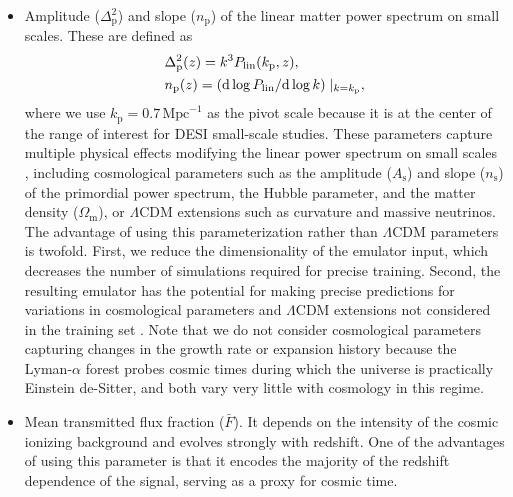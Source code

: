 \documentclass[fleqn,usenatbib]{mnras}
\newcommand{\lyaf}{Lyman-$\alpha$ forest\xspace}
\newcommand{\mflux}{\ensuremath{\bar{F}}\xspace}
\begin{document}
\begin{itemize}
    \item Amplitude ($\Delta^2_\mathrm{p}$) and slope ($n_\mathrm{p}$) of the linear matter power spectrum on small scales. These are defined as
    \begin{align}
        \label{eq:amplitude}
        & \Delta_\mathrm{p}^2(z) = k^3 P_{\rm lin} (k_\mathrm{p}, z),\\
        \label{eq:slope}
        & n_\mathrm{p}(z) = \left(\mathrm{d}\log P_{\rm lin} / \mathrm{d}\log k\right)\mid_{k = k_\mathrm{p}},
    \end{align}
    where we use $k_\mathrm{p} = 0.7\,\mathrm{Mpc}^{-1}$ as the pivot scale because it is at the center of the range of interest for DESI small-scale studies. These parameters capture multiple physical effects modifying the linear power spectrum on small scales \citep[see][for a detailed discussion]{Pedersen2021}, including cosmological parameters such as the amplitude ($A_\mathrm{s}$) and slope ($n_\mathrm{s}$) of the primordial power spectrum, the Hubble parameter, and the matter density ($\Omega_\mathrm{m}$), or $\Lambda$CDM extensions such as curvature and massive neutrinos. The advantage of using this parameterization rather than $\Lambda$CDM parameters is twofold. First, we reduce the dimensionality of the emulator input, which decreases the number of simulations required for precise training. Second, the resulting emulator has the potential for making precise predictions for variations in cosmological parameters and $\Lambda$CDM extensions not considered in the training set \citep[][]{Pedersen2021, pedersen2023CompressingCosmologicalInformation, cabayol-garcia2023NeuralNetworkEmulator}. Note that we do not consider cosmological parameters capturing changes in the growth rate or expansion history because the \lyaf probes cosmic times during which the universe is practically Einstein de-Sitter, and both vary very little with cosmology in this regime.

    \item Mean transmitted flux fraction (\mflux). It depends on the intensity of the cosmic ionizing background and evolves strongly with redshift. One of the advantages of using this parameter is that it encodes the majority of the redshift dependence of the signal, serving as a proxy for cosmic time.


\end{itemize}
\end{document}
